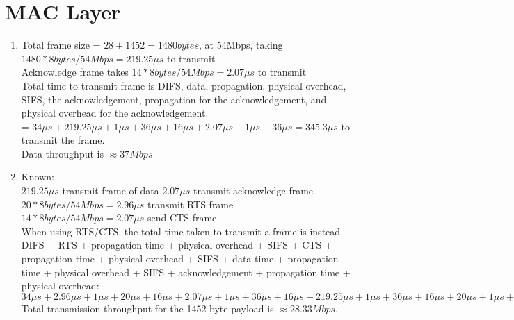 \documentclass[11pt]{article}
\begin{document}
\section{MAC Layer}
\begin{enumerate}[label=(\alph*)]
\item {
	Total frame size = $28 + 1452 = 1480 bytes$, at 54Mbps, taking $1480 * 8 bytes/54 Mbps = 219.25 \mu s$ to transmit \\	
	Acknowledge frame takes $14 * 8 bytes/54 Mbps = 2.07 \mu s$ to transmit \\
	
	Total time to transmit frame is DIFS, data, propagation, physical overhead, SIFS, the acknowledgement, propagation for the acknowledgement, and physical overhead for the acknowledgement. \\
	 = $34 \mu s + 219.25 \mu s + 1 \mu s + 36 \mu s + 16 \mu s + 2.07 \mu s + 1 \mu s + 36 \mu s = 345.3 \mu s$ to transmit the frame. \\
	Data throughput is $\approx 37 Mbps$
}
\item {
	Known: \\
	$219.25 \mu s$ transmit frame of data
	$2.07 \mu s$ transmit acknowledge frame \\ 
	$20 * 8 bytes/54 Mbps = 2.96 \mu s$ transmit RTS frame \\		
	$14 * 8 bytes/54 Mbps = 2.07 \mu s$ send CTS frame \\
	
	When using RTS/CTS, the total time taken to transmit a frame is instead DIFS + RTS + propagation time + physical overhead + SIFS + CTS + propagation time + physical overhead + SIFS + data time + 		
	propagation time + physical overhead + SIFS + acknowledgement + propagation time + physical overhead: \\
	
	$34 \mu s + 2.96 \mu s + 1 \mu s + 20 \mu s + 16 \mu s + 2.07 \mu s + 1 \mu s + 36 \mu s + 16 \mu s + 219.25 \mu s + 1 \mu s + 36 \mu s + 16 \mu s + 20 \mu s + 1 \mu s + 36 \mu s = 410 \mu s$ \\
	
	Total transmission throughput for the 1452 byte payload is $\approx 28.33 Mbps$.
}
\end{enumerate}
\end{document}
